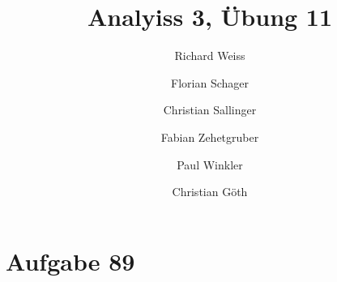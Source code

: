 \documentclass{article}
\title{Analyiss 3, Übung 11}
\author{Richard Weiss \and Florian Schager \and Christian Sallinger \and Fabian Zehetgruber \and Paul Winkler \and Christian Göth}
\begin{document}
    \begin{titlepage}
        \maketitle
    \end{titlepage}

    \section{Aufgabe 89}
    
\end{document}
